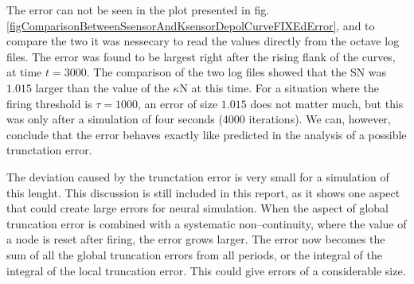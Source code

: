 The error can not be seen in the plot presented in fig. \ref{figComparisonBetweenSsensorAndKsensorDepolCurveFIXEdError}, and to compare the two it was nessecary to read the values directly from the octave log files.
The error was found to be largest right after the rising flank of the curves, at time $t=3000$. 
The comparison of the two log files showed that the SN was $1.015$ larger than the value of the $\kappa$N at this time.
For a situation where the firing threshold is $\tau=1000$, an error of size $1.015$ does not matter much, but this was only after a simulation of four seconds (4000 iterations). 
We can, however, conclude that the error behaves exactly like predicted in the analysis of a possible trunctation error.

The deviation caused by the trunctation error is very small for a simulation of this lenght.
This discussion is still included in this report, as it shows one aspect that could create large errors for neural simulation. 
When the aspect of global truncation error is combined with a systematic non--continuity, where the value of a node is reset after firing, the error grows larger.
The error now becomes the sum of all the global truncation errors from all periods, or the integral of the integral of the local truncation error.
This could give errors of a considerable size. 



